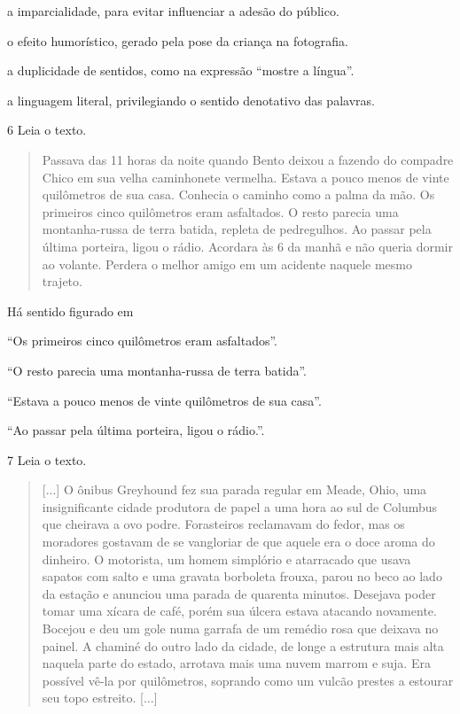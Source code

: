 \begin{escolha}
\item
a imparcialidade, para evitar influenciar a adesão do público.
\item
o efeito humorístico, gerado pela pose da criança na fotografia.
\item
a duplicidade de sentidos, como na expressão ``mostre a língua''.
\item
a linguagem literal, privilegiando o sentido denotativo das palavras.
\end{escolha}

\num{6} Leia o texto.

\begin{quote}
Passava das 11 horas da noite quando Bento deixou a fazendo do compadre
Chico em sua velha caminhonete vermelha. Estava a pouco menos de vinte
quilômetros de sua casa. Conhecia o caminho como a palma da mão. Os
primeiros cinco quilômetros eram asfaltados. O resto parecia uma
montanha-russa de terra batida, repleta de pedregulhos. Ao passar pela
última porteira, ligou o rádio. Acordara às 6 da manhã e não queria
dormir ao volante. Perdera o melhor amigo em um acidente naquele mesmo
trajeto.
\end{quote}


Há sentido figurado em

\begin{escolha}
\item ``Os primeiros cinco quilômetros eram asfaltados''.

\item ``O resto parecia uma montanha-russa de terra batida''.

\item ``Estava a pouco menos de vinte quilômetros de sua casa''.

\item ``Ao passar pela última porteira, ligou o rádio.''.
\end{escolha}


\num{7} Leia o texto.

\begin{quote}
[...] O ônibus Greyhound fez sua parada regular em Meade, Ohio, uma
insignificante cidade produtora de papel a uma hora ao sul de Columbus
que cheirava a ovo podre. Forasteiros reclamavam do fedor, mas os moradores gostavam de se vangloriar de que
aquele era o doce aroma do dinheiro. O motorista, um homem simplório e
atarracado que usava sapatos com salto e uma gravata borboleta frouxa,
parou no beco ao lado da estação e anunciou uma parada de quarenta
minutos. Desejava poder tomar uma xícara de café, porém sua úlcera
estava atacando novamente. Bocejou e deu um gole numa garrafa de um
remédio rosa que deixava no painel. A chaminé do outro lado da cidade,
de longe a estrutura mais alta naquela parte do estado, arrotava mais
uma nuvem marrom e suja. Era possível vê-la por quilômetros, soprando
como um vulcão prestes a estourar seu topo estreito.
{[}...{]}
\end{quote}

